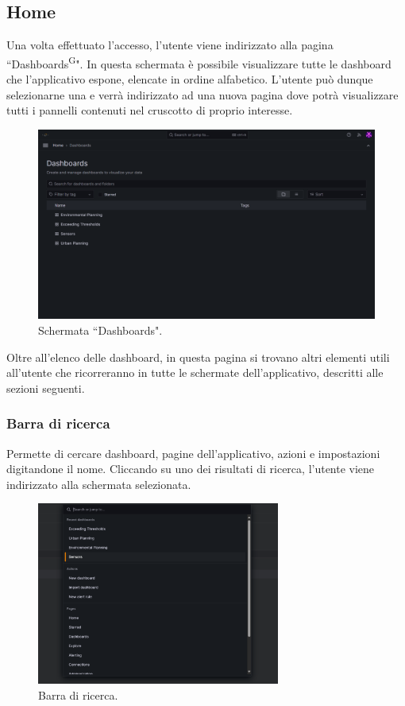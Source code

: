 \documentclass[8pt]{article}
\newcommand{\glossterm}[1]{#1\textsuperscript{G}} %
\begin{document}
\subsection{Home}
Una volta effettuato l'accesso, l'utente viene indirizzato alla pagina ``\glossterm{Dashboards}". 
In questa schermata è possibile visualizzare tutte le dashboard che l'applicativo espone, elencate in ordine alfabetico. L'utente può dunque selezionarne una e verrà indirizzato ad una nuova pagina dove potrà visualizzare tutti i pannelli contenuti nel cruscotto di proprio interesse.
\begin{figure}[H]
    \centering
    \includegraphics[width=15cm]{./images_mu/dashboards.png}
    \caption{Schermata ``Dashboards".}
    \label{figure:Schermata Dashboards.}
\end{figure}
Oltre all'elenco delle dashboard, in questa pagina si trovano altri elementi utili all'utente che ricorreranno in tutte le schermate dell'applicativo, descritti alle sezioni seguenti.

\subsubsection{Barra di ricerca} 
Permette di cercare dashboard, pagine dell'applicativo, azioni e impostazioni digitandone il nome. Cliccando su uno dei risultati di ricerca, l'utente viene indirizzato alla schermata selezionata.
\begin{figure}[H]
    \centering
    \includegraphics[width=8cm]{./images_mu/search.png}
    \caption{Barra di ricerca.}
    \label{figure:Barra di ricerca.}
\end{figure}
\end{document}
